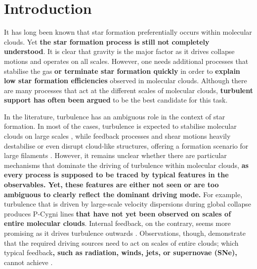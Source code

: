 \section{Introduction}\label{intro}

It has long been known that star formation preferentially occurs within molecular clouds. 
Yet \textbf{the star formation process is still not completely understood}.
It is clear that gravity is the major factor as it drives collapse motions and operates on all scales.
However, one needs additional processes that stabilise the gas \textbf{or terminate star formation quickly} in order to \textbf{explain low star formation efficiencies} observed in molecular clouds. 
Although there are many processes that act at the different scales of molecular clouds, \textbf{turbulent support has often been argued} to be the best candidate for this task.

In the literature, turbulence has an ambiguous role in the context of star formation. 
In most of the cases, turbulence is expected to stabilise molecular clouds on large scales \citep{Fleck1980,McKee1992,MacLow2003}, while feedback processes and shear motions heavily destabilise or even disrupt cloud-like structures, offering a formation scenario for large filaments \citep{Tan2013,Miyamoto2014}. 
However, it remains unclear whether there are particular mechanisms that dominate the driving of turbulence within molecular clouds, \textbf{as every process is supposed to be traced by typical features in the observables.
Yet, these features are either not seen or are too ambiguous to clearly reflect the dominant driving mode.}
For example, turbulence that is driven by large-scale velocity dispersions during global collapse \citep{Ballesteros2011a,Ballesteros2011b,Hartmann2012} produces P-Cygni lines \textbf{ that have not yet been observed on scales of entire molecular clouds}. 
Internal feedback, on the contrary, seems more promising as it drives turbulence outwards \citep{Dekel2013,Krumholz2014}.
Observations, though, demonstrate that the required driving sources need to act on scales of entire clouds; which typical feedback\textbf{, such as radiation, winds, jets, or supernovae (SNe),} cannot achieve \citep{Heyer2004,Brunt2009,Brunt2013}.

